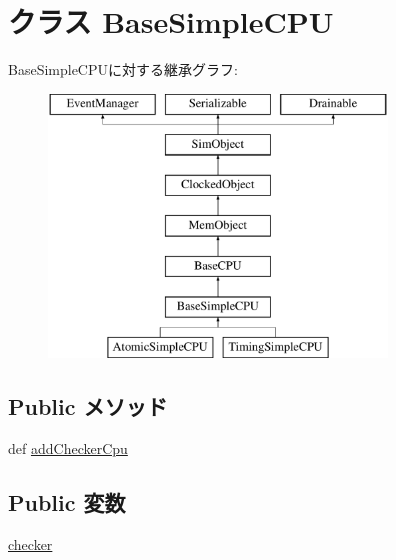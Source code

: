 \hypertarget{classBaseSimpleCPU_1_1BaseSimpleCPU}{
\section{クラス BaseSimpleCPU}
\label{classBaseSimpleCPU_1_1BaseSimpleCPU}
}
BaseSimpleCPUに対する継承グラフ:\begin{figure}[H]
\begin{center}
\leavevmode
\includegraphics[height=7cm]{classBaseSimpleCPU_1_1BaseSimpleCPU}
\end{center}
\end{figure}
\subsection*{Public メソッド}
\begin{DoxyCompactItemize}
\item 
def \hyperlink{classBaseSimpleCPU_1_1BaseSimpleCPU_a97c178b398a7fc7e24932f2058d14381}{addCheckerCpu}
\end{DoxyCompactItemize}
\subsection*{Public 変数}
\begin{DoxyCompactItemize}
\item 
\hyperlink{classBaseSimpleCPU_1_1BaseSimpleCPU_ad4f09c6c6f92935f2d917a5b0ba77cb0}{checker}
\end{DoxyCompactItemize}

